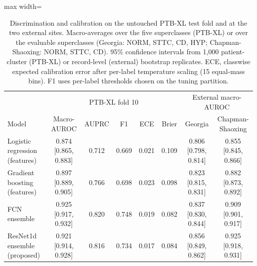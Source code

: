 \begin{table}[!t]
\centering\small
\caption{Discrimination and calibration on the untouched PTB-XL test fold and at the two external sites. Macro-averages over the five superclasses (PTB-XL) or over the evaluable superclasses (Georgia: NORM, STTC, CD, HYP; Chapman-Shaoxing: NORM, STTC, CD). 95\% confidence intervals from 1,000 patient-cluster (PTB-XL) or record-level (external) bootstrap replicates. ECE, classwise expected calibration error after per-label temperature scaling (15 equal-mass bins). F1 uses per-label thresholds chosen on the tuning partition.}
\label{tab:discrimination}
\setlength{\tabcolsep}{3.5pt}
\begin{adjustbox}{max width=\linewidth}
\begin{tabular}{lccccc|cc}
\toprule
 & \multicolumn{5}{c|}{PTB-XL fold 10} & \multicolumn{2}{c}{External macro-AUROC} \\
Model & Macro-AUROC & AUPRC & F1 & ECE & Brier & Georgia & Chapman-Shaoxing \\
\midrule
Logistic regression (features) & 0.874 [0.865, 0.883] & 0.712 & 0.669 & 0.021 & 0.109 & 0.806 [0.798, 0.814] & 0.855 [0.845, 0.866] \\
Gradient boosting (features) & 0.897 [0.889, 0.905] & 0.766 & 0.698 & 0.023 & 0.098 & 0.823 [0.815, 0.831] & 0.882 [0.873, 0.892] \\
FCN ensemble & 0.925 [0.917, 0.932] & 0.820 & 0.748 & 0.019 & 0.082 & 0.837 [0.830, 0.844] & 0.909 [0.901, 0.917] \\
ResNet1d ensemble (proposed) & 0.921 [0.914, 0.928] & 0.816 & 0.734 & 0.017 & 0.084 & 0.856 [0.849, 0.862] & 0.925 [0.918, 0.931] \\
\bottomrule
\end{tabular}
\end{adjustbox}
\end{table}
